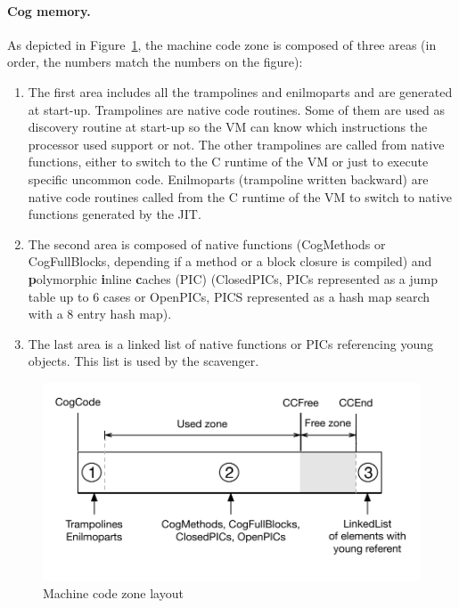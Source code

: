 \documentclass[10pt,preprint,nonatbib]{sigplanconf}
\newcommand{\figref}[1]{Figure~\ref{fig:#1}}
\begin{document}
\paragraph{Cog memory.} As depicted in \figref{CogMemory}, the machine code zone is composed of three areas (in order, the numbers match the numbers on the figure):
\begin{enumerate}
	\item The first area includes all the trampolines and enilmoparts and are generated at start-up. Trampolines are native code routines. Some of them are used as discovery routine at start-up so the VM can know which instructions the processor used support or not. The other trampolines are called from native functions, either to switch to the C runtime of the VM or just to execute specific uncommon code. Enilmoparts (trampoline written backward) are native code routines called from the C runtime of the VM to switch to native functions generated by the JIT. 
	\item The second area is composed of native functions (CogMethods or CogFullBlocks, depending if a method or a block closure is compiled) and \textbf{p}olymorphic \textbf{i}nline \textbf{c}aches (PIC) (ClosedPICs, PICs represented as a jump table up to 6 cases or OpenPICs, PICS represented as a hash map search with a 8 entry hash map). 
	\item The last area is a linked list of native functions or PICs referencing young objects. This list is used by the scavenger.
\end{enumerate}

\begin{figure}[htp!]
     \begin{center}
         \includegraphics[width=\linewidth]{CogMemory}
         \caption{Machine code zone layout}
         \label{fig:CogMemory}
     \end{center}
 \end{figure}
\end{document}
